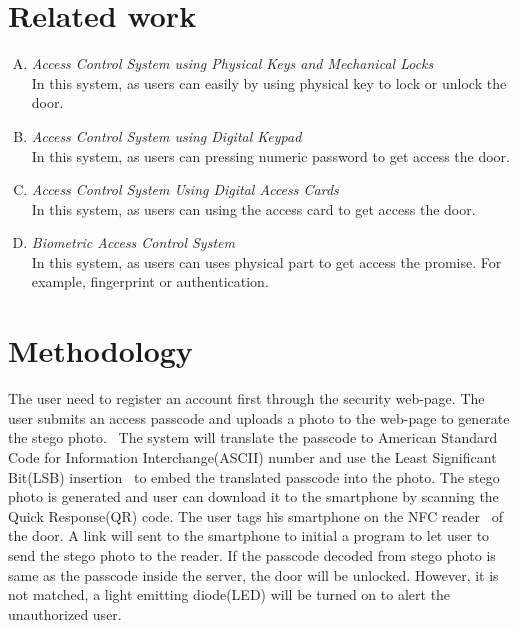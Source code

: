 \documentclass[•]{article}
\begin{document}
\section{Related work}
\begin{enumerate}[A.]
\item \textit{Access Control System using Physical Keys and Mechanical Locks}\\
In this system, as users can easily by using physical key to lock or unlock the door.\\
\item \textit{Access Control System using Digital Keypad}\\
In this system, as users can pressing numeric password to get access the door.\\
\item \textit{Access Control System Using Digital Access Cards}\\
In this system, as users can using the access card to get access the door.\\
\item \textit{Biometric Access Control System}\\
In this system, as users can uses physical part to get access the promise. For example, fingerprint or authentication.~\cite{Batool6151452}
\end{enumerate}

\section{Methodology}
\hspace{1cm}The user need to register an account first through the security web-page. The user submits an access passcode and uploads a photo to the web-page to generate the stego photo.~\cite{Zhao4224148} The system will translate the passcode to American Standard Code for Information Interchange(ASCII) number and use the Least Significant Bit(LSB) insertion~\cite{Katzenbeisser2000} to embed the translated passcode into the photo. The stego photo is generated and user can download it to the smartphone by scanning the Quick Response(QR) code.
The user tags his smartphone on the NFC reader~\cite{Madlmayr4529403} of the door. A link will sent to the smartphone to initial a program to let user to send the stego photo to the reader.
If the passcode decoded from stego photo is same as the passcode inside the server, the door will be unlocked. However, it is not matched, a light emitting diode(LED) will be turned on to alert the unauthorized user.
\end{document}
